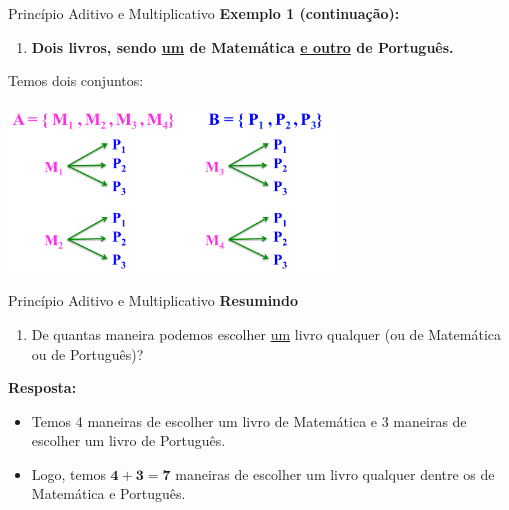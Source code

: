 \documentclass[aspectratio=169]{beamer}
\begin{document}
\begin{frame}{Princípio Aditivo e Multiplicativo}
    \textbf{Exemplo 1 (continuação):}

    \vspace{3mm}

    \begin{enumerate}[a]
        \item \textbf{Dois livros, sendo \underline{um} de Matemática \underline{e outro} de Português.}
    \end{enumerate}

    \vspace{3mm}

    Temos dois conjuntos:

    \begin{center}
        \includegraphics[width=0.65\textwidth]{figs/combinacoes_livros.png}
    \end{center}
\end{frame}

\begin{frame}{Princípio Aditivo e Multiplicativo}
    \textbf{Resumindo}

    \vspace{4mm}

    \begin{enumerate}[a]
        \item De quantas maneira podemos escolher \underline{um} livro qualquer (ou de Matemática ou de Português)?
    \end{enumerate}

    \textbf{Resposta:}

    \vspace{3mm}

    \begin{itemize}
        \item Temos 4 maneiras de escolher um livro de Matemática e 3 maneiras de escolher um livro de Português.
        \item Logo, temos $\boldsymbol{4+3=7}$ maneiras de escolher um livro qualquer dentre os de Matemática e Português.
    \end{itemize}
\end{frame}
\end{document}
